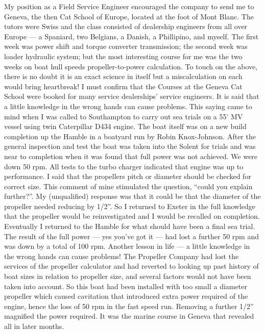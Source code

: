 My position as a Field Service Engineer encouraged the company to send me to
Geneva, the then Cat School of Europe, located at the foot of Mont Blanc. The
tutors were Swiss and the class consisted of dealership engineers from all over
Europe --- a Spaniard, two Belgians, a Danish, a Phillipino, and myself.
The first week was power shift and torque converter transmission; the second
week was loader hydraulic system; but the most interesting course for me was
the two weeks on boat hull speeds propeller-to-power calculation. To touch on
the above, there is no doubt it is an exact science in itself but a
miscalculation on each would bring heartbreak! I must confirm that the Courses
at the Geneva Cat School were booked for many service dealerships' service
engineers. It is said that a little knowledge in the wrong hands can cause
problems. This saying came to mind when I was called to Southampton to carry
out sea trials on a 55' MV vessel using twin Caterpillar D434 engine. The boat
itself was on a new build completion up the Hamble in a boatyard run by Robin
Knox-Johnson. After the general inspection and test the boat was taken into the
Solent for trials and was near to completion when it was found that full power
was not achieved. We were down 50 rpm. All tests to the turbo charger indicated
that engine was up to performance. I said that the propellers pitch or diameter
should be checked for correct size. This comment of mine stimulated the
question, ``could you explain further?''. My (unqualified) response was that it
could be that the diameter of the propeller needed reducing by 1/2''. So I
returned to Exeter in the full knowledge that the propeller would be
reinvestigated and I would be recalled on completion. Eventually I returned to
the Hamble for what should have been a final sea trial. The result of the full
power --- yes you've got it --- had lost a further 50 rpm and was down by a
total of 100 rpm. Another lesson in life --- a little knowledge in the wrong
hands can cause problems! The Propeller Company had lost the services of the
propeller calculator and had reverted to looking up past history of boat sizes
in relation to propeller size, and several factors would not have been taken
into account. So this boat had been installed with too small a diameter
propeller which caused cavitation that introduced extra power required of the
engine, hence the loss of 50 rpm in the fast speed run. Removing a further
1/2'' magnified the power required. It was the marine course in Geneva that
revealed all in later months.

